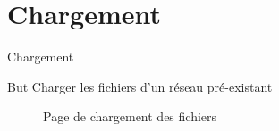 \documentclass{beamer}
\begin{document}
\section{Chargement}

\begin{frame}[fragile]{\textcolor{bleu2}{\hspace{1cm}Chargement}}
	\begin{center}
		\begin{minipage}[c]{0.9\textwidth}
			\begin{block}{\hspace{0.2cm}But}
 				Charger les fichiers d'un réseau pré-existant
 			\end{block}
 		\end{minipage}
 	\end{center}
	\begin{figure}
		\begin{center}
			\caption{Page de chargement des fichiers}
		\end{center}
	\end{figure}
\end{frame}
\end{document}
